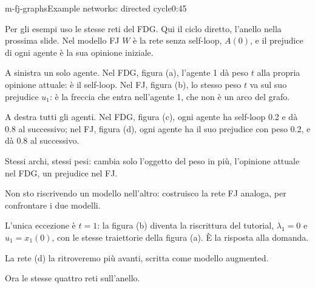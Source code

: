 \begin{slide}{m-fj-graphs}{Example networks: directed cycle}{0:45 {\color{red}}}
  \begin{discorso}
    \item Per gli esempi uso le stesse reti del FDG. Qui il ciclo {\color{red}} {\color{blue}diretto,} l'anello {\color{red}    } {\color{blue}nella prossima slide.} Nel modello FJ $W$ è la rete senza self-loop, $A(0)$, e il prejudice di ogni agente è la sua opinione iniziale.
    \item A sinistra un solo agente. Nel FDG, figura (a), l'agente 1 dà peso $t$ alla propria opinione attuale: è il self-loop. Nel FJ, figura (b), lo stesso peso $t$ va sul suo prejudice $u_1$: è la freccia che entra nell'agente 1, che non è un arco del grafo.
    \item A destra tutti gli agenti. Nel FDG, figura (c), ogni agente ha self-loop 0.2 e dà 0.8 al successivo; nel FJ, figura (d), ogni agente ha il suo prejudice con peso 0.2, e dà 0.8 al successivo.
    \item Stessi archi, stessi pesi: cambia solo l'oggetto del peso in più, l'opinione attuale nel FDG, un prejudice nel FJ.
    \item Non sto riscrivendo un modello nell'altro: costruisco la rete FJ analoga, per confrontare i due modelli.
    \item L'unica eccezione è $t=1$: la figura (b) diventa la riscrittura del tutorial, $\lambda_1=0$ e $u_1=x_1(0)$, con le stesse traiettorie della figura (a). È la risposta alla domanda.
    \item La rete (d) la ritroveremo più avanti, scritta come modello augmented.
    \item {\color{blue}Ora le stesse quattro reti sull'anello.}
    \item {\color{red}       }
  \end{discorso}
\end{slide}

